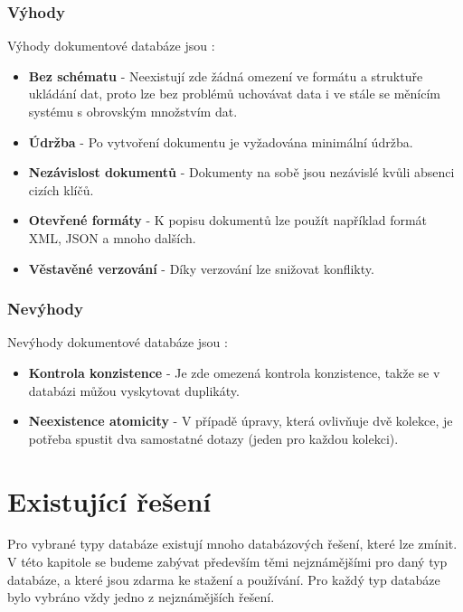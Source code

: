 \subsubsection{Výhody}
Výhody dokumentové databáze jsou \cite{advantages_document}:
\begin{itemize}
\item \textbf{Bez schématu} - Neexistují zde žádná omezení ve formátu a struktuře ukládání dat, proto lze bez problémů uchovávat data i ve stále se měnícím systému s obrovským množstvím dat.
\item \textbf{Údržba} - Po vytvoření dokumentu je vyžadována minimální údržba.
\item \textbf{Nezávislost dokumentů} - Dokumenty na sobě jsou nezávislé kvůli absenci cizích klíčů.
\item \textbf{Otevřené formáty} - K popisu dokumentů lze použít například formát \gls{XML}, \gls{JSON} a mnoho dalších.
\item \textbf{Věstavěné verzování} - Díky verzování lze snižovat konflikty.
\end{itemize}

\subsubsection{Nevýhody}
Nevýhody dokumentové databáze jsou \cite{advantages_document}:
\begin{itemize}
\item \textbf{Kontrola konzistence} - Je zde omezená kontrola konzistence, takže se v databázi můžou vyskytovat duplikáty.
\item \textbf{Neexistence atomicity} - V případě úpravy, která ovlivňuje dvě kolekce, je potřeba spustit dva samostatné dotazy (jeden pro každou kolekci).
\end{itemize}

\section{Existující řešení} \label{sec:existujici_reseni}
Pro vybrané typy databáze existují mnoho databázových řešení, které lze zmínit. V této kapitole se budeme zabývat především těmi nejznámějšími pro daný typ databáze, a které jsou zdarma ke stažení a používání. Pro každý typ databáze bylo vybráno vždy jedno z nejznámějších řešení.
